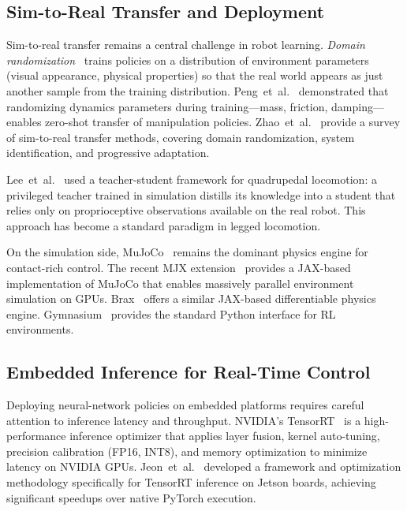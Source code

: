\documentclass[conference]{IEEEtran}
\begin{document}
\subsection{Sim-to-Real Transfer and Deployment}

Sim-to-real transfer remains a central challenge in robot learning.
\emph{Domain randomization}~\cite{tobin2017domain} trains policies on a
distribution of environment parameters (visual appearance, physical
properties) so that the real world appears as just another sample from the
training distribution.  Peng~et~al.~\cite{peng2018simtoreal}
demonstrated that randomizing dynamics parameters during training---mass,
friction, damping---enables zero-shot transfer of manipulation policies.
Zhao~et~al.~\cite{zhao2020simtoreal} provide a survey of sim-to-real
transfer methods, covering domain randomization, system identification,
and progressive adaptation.

Lee~et~al.~\cite{lee2020learning} used a teacher-student framework for
quadrupedal locomotion: a privileged teacher trained in simulation
distills its knowledge into a student that relies only on proprioceptive
observations available on the real robot.  This approach has become a
standard paradigm in legged locomotion.

On the simulation side, MuJoCo~\cite{todorov2012mujoco} remains the
dominant physics engine for contact-rich control.  The recent
MJX extension~\cite{zakka2025mujoco} provides a JAX-based implementation
of MuJoCo that enables massively parallel environment simulation on GPUs.
Brax~\cite{freeman2021brax} offers a similar JAX-based differentiable
physics engine.  Gymnasium~\cite{towers2024gymnasium} provides the
standard Python interface for RL environments.

\subsection{Embedded Inference for Real-Time Control}

Deploying neural-network policies on embedded platforms requires careful
attention to inference latency and throughput.  NVIDIA's
TensorRT~\cite{nvidia2024tensorrt} is a high-performance inference
optimizer that applies layer fusion, kernel auto-tuning, precision
calibration (FP16, INT8), and memory optimization to minimize latency on
NVIDIA GPUs.  Jeon~et~al.~\cite{jeon2022tensorrt} developed a framework
and optimization methodology specifically for TensorRT inference on Jetson
boards, achieving significant speedups over native PyTorch execution.
\end{document}
